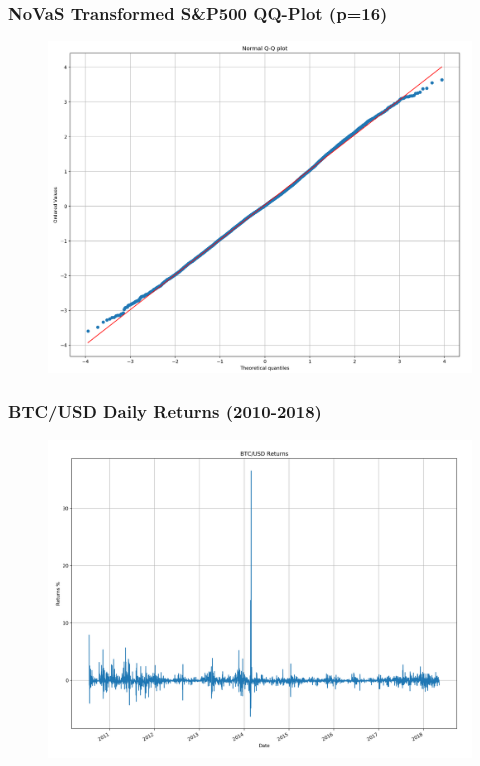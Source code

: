 \documentclass{beamer}
\begin{document}
\begin{frame}
\frametitle{NoVaS Transformed S&P500 QQ-Plot (p=16)}
\begin{figure}[h!]
\includegraphics[width=\textwidth]{novas_sp500_returns_qqplot.png}
\end{figure}
\end{frame}


\begin{frame}
\frametitle{BTC/USD Daily Returns (2010-2018)}
\begin{figure}[h!]
\centering 
\includegraphics[width=\textwidth]{btc_returns.png}
\end{figure}
\end{frame}
\end{document}
